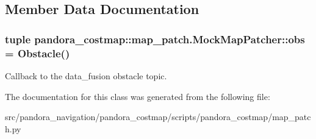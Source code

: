 \subsection{\-Member \-Data \-Documentation}
\hypertarget{classpandora__costmap_1_1map__patch_1_1_mock_map_patcher_a63d5887aca7a1dd30d9de2310edae78a}{
\subsubsection[{obs}]{\setlength{\rightskip}{0pt plus 5cm}tuple {\bf pandora\-\_\-costmap\-::map\-\_\-patch.\-Mock\-Map\-Patcher\-::obs} = \-Obstacle()}}\label{classpandora__costmap_1_1map__patch_1_1_mock_map_patcher_a63d5887aca7a1dd30d9de2310edae78a}
\begin{DoxyVerb}Callback to the data_fusion obstacle topic.
\end{DoxyVerb}
 

\-The documentation for this class was generated from the following file\-:\begin{DoxyCompactItemize}
\item 
src/pandora\-\_\-navigation/pandora\-\_\-costmap/scripts/pandora\-\_\-costmap/map\-\_\-patch.\-py\end{DoxyCompactItemize}
